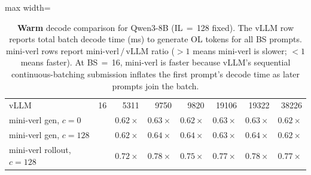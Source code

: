 \begin{table}[htbp]
\begin{adjustbox}{max width=\textwidth}
\begin{tabular}{lcrrrrrr}
        \midrule
        vLLM                         & 16 & 5311 & 9750 & 9820 & 19106 & 19322 & 38226 \\
        mini-verl gen, $c{=}0$       &    & $0.62{\times}$ & $0.63{\times}$ & $0.62{\times}$ & $0.63{\times}$ & $0.63{\times}$ & $0.62{\times}$ \\
        mini-verl gen, $c{=}128$     &    & $0.62{\times}$ & $0.64{\times}$ & $0.64{\times}$ & $0.63{\times}$ & $0.64{\times}$ & $0.62{\times}$ \\
        mini-verl rollout, $c{=}128$ &    & $0.72{\times}$ & $0.78{\times}$ & $0.75{\times}$ & $0.77{\times}$ & $0.78{\times}$ & $0.77{\times}$ \\
        \bottomrule
    \end{tabular}
    \end{adjustbox}
    \caption{%
        \textbf{Warm} decode comparison for Qwen3-8B (IL$\,{=}\,$128 fixed).
        The vLLM row reports total batch decode time (ms) to generate OL tokens
        for all BS prompts.
        mini-verl rows report $\text{mini-verl}\,/\,\text{vLLM}$ ratio
        (${>}1$ means mini-verl is slower; ${<}1$ means faster).
        At BS$\,{=}\,$16, mini-verl is faster because vLLM's sequential
        continuous-batching submission inflates the first prompt's
        decode time as later prompts join the batch.
    }
    \label{tab:qwen3-decode-warm}
\end{table}

